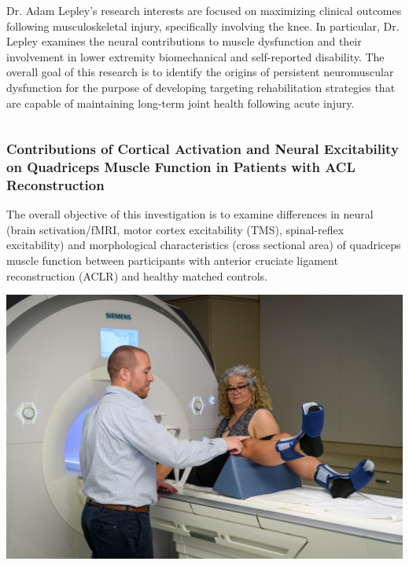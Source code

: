 \documentclass[aspectratio=169]{beamer}
\begin{document}
\begin{frame}
\begin{columns}[T]
		\begin{column}{.75\textwidth}
			Dr. Adam Lepley's research interests are focused on maximizing clinical outcomes following musculoskeletal injury, specifically involving the knee. In particular, Dr. Lepley examines the neural contributions to muscle dysfunction and their involvement in lower extremity biomechanical and self-reported disability. The overall goal of this research is to identify the origins of persistent neuromuscular dysfunction for the purpose of developing targeting rehabilitation strategies that are capable of maintaining long-term joint health following acute injury.
		\end{column}
	\end{columns}
\end{frame}


\begin{frame}
	\frametitle{Contributions of Cortical Activation and Neural Excitability on Quadriceps Muscle Function in Patients with ACL Reconstruction}

	The overall objective of this investigation is to examine differences in neural (brain sctivation/fMRI, motor cortex excitability (TMS), spinal-reflex excitability) and morphological characteristics (cross sectional area) of quadriceps muscle function between participants with anterior cruciate ligament reconstruction (ACLR) and healthy matched controls. 
	
	\begin{center}
		\includegraphics[height=.6\textheight]{img/acl1.jpg}
	\end{center}

\end{frame}
\end{document}
